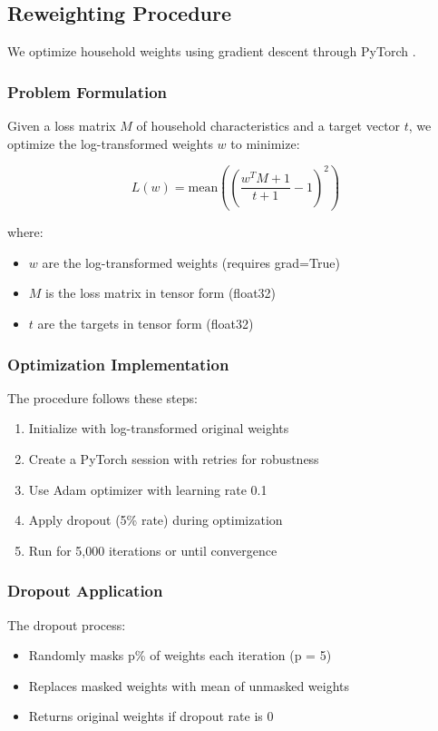 \subsection{Reweighting Procedure}

We optimize household weights using gradient descent through PyTorch \citep{pytorch2019}.

\subsubsection{Problem Formulation}

Given a loss matrix $M$ of household characteristics and a target vector $t$, we optimize the log-transformed weights $w$ to minimize:

\[ L(w) = \text{mean}\left(\left(\frac{w^T M + 1}{t + 1} - 1\right)^2\right) \]

where:
\begin{itemize}
    \item $w$ are the log-transformed weights (requires grad=True)
    \item $M$ is the loss matrix in tensor form (float32)
    \item $t$ are the targets in tensor form (float32)
\end{itemize}

\subsubsection{Optimization Implementation}

The procedure follows these steps:

\begin{enumerate}
    \item Initialize with log-transformed original weights
    \item Create a PyTorch session with retries for robustness
    \item Use Adam optimizer with learning rate 0.1
    \item Apply dropout (5\% rate) during optimization
    \item Run for 5,000 iterations or until convergence
\end{enumerate}

\subsubsection{Dropout Application}

The dropout process:
\begin{itemize}
    \item Randomly masks p\% of weights each iteration (p = 5)
    \item Replaces masked weights with mean of unmasked weights
    \item Returns original weights if dropout rate is 0
\end{itemize}

